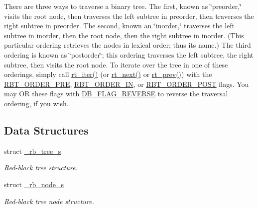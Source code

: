There are three ways to traverse a binary tree. The first, known as \char`\"{}preorder,\char`\"{} visits the root node, then traverses the left subtree in preorder, then traverses the right subtree in preorder. The second, known an \char`\"{}inorder,\char`\"{} traverses the left subtree in inorder, then the root node, then the right subtree in inorder. (This particular ordering retrieves the nodes in lexical order; thus its name.) The third ordering is known as \char`\"{}postorder\char`\"{}; this ordering traverses the left subtree, the right subtree, then visits the root node. To iterate over the tree in one of these orderings, simply call \hyperlink{group__dbprim__rbtree_ga11}{rt\_\-iter()} (or \hyperlink{group__dbprim__rbtree_ga10}{rt\_\-next()} or \hyperlink{group__dbprim__rbtree_ga28}{rt\_\-prev()}) with the \hyperlink{group__dbprim__rbtree_ga24}{RBT\_\-ORDER\_\-PRE}, \hyperlink{group__dbprim__rbtree_ga25}{RBT\_\-ORDER\_\-IN}, or \hyperlink{group__dbprim__rbtree_ga26}{RBT\_\-ORDER\_\-POST} flags. You may OR these flags with \hyperlink{group__dbprim_ga4}{DB\_\-FLAG\_\-REVERSE} to reverse the traversal ordering, if you wish.

\subsection*{Data Structures}
\begin{CompactItemize}
\item 
struct \hyperlink{struct__rb__tree__s}{\_\-rb\_\-tree\_\-s}
\begin{CompactList}\small\item\em Red-black tree structure. \item\end{CompactList}\item 
struct \hyperlink{struct__rb__node__s}{\_\-rb\_\-node\_\-s}
\begin{CompactList}\small\item\em Red-black tree node structure. \item\end{CompactList}\end{CompactItemize}
